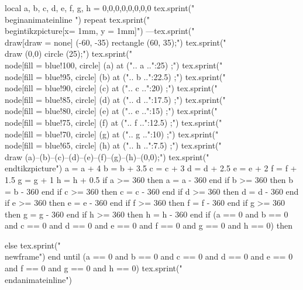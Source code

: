 
\usepackage{animate}
\usetikzlibrary{external}
\tikzexternalize[mode = list and make]

\begin{luacode}
local a, b, c, d, e, f, g, h = 0,0,0,0,0,0,0,0
tex.sprint("\\begin{animateinline}{24}")
repeat
	tex.sprint("\\begin{tikzpicture}[x= 1mm, y = 1mm]")
	---tex.sprint("\\draw[draw = none] (-60, -35) rectangle (60, 35);")
	tex.sprint("\\draw (0,0) circle (25);")
    tex.sprint("\\node[fill = blue!100, circle] (a) at (".. a ..":25) { };")
    tex.sprint("\\node[fill = blue!95, circle] (b) at (".. b ..":22.5) { };")
    tex.sprint("\\node[fill = blue!90, circle] (c) at (".. c ..":20) { };")
    tex.sprint("\\node[fill = blue!85, circle] (d) at (".. d ..":17.5) { };")
    tex.sprint("\\node[fill = blue!80, circle] (e) at (".. e ..":15) { };")
    tex.sprint("\\node[fill = blue!75, circle] (f) at (".. f ..":12.5) { };")
    tex.sprint("\\node[fill = blue!70, circle] (g) at (".. g ..":10) { };")
    tex.sprint("\\node[fill = blue!65, circle] (h) at (".. h ..":7.5) { };")
    tex.sprint("\\draw (a)--(b)--(c)--(d)--(e)--(f)--(g)--(h)--(0,0);")
    tex.sprint("\\end{tikzpicture}")
    a = a + 4
    b = b + 3.5
    c = c + 3
    d = d + 2.5
    e = e + 2
    f = f + 1.5
    g = g + 1
    h = h + 0.5
    if a >= 360 then
        a = a - 360
    end
    if b >= 360 then
        b = b - 360
    end
    if c >= 360 then
        c = c - 360
    end
    if d >= 360 then
        d = d - 360
    end
    if e >= 360 then
        e = e - 360
    end
    if f >= 360 then
        f = f - 360
    end
    if g >= 360 then
        g = g - 360
    end
    if h >= 360 then
        h = h - 360
    end
    if (a == 0 and b == 0 and c == 0 and d == 0 and e == 0 and f == 0 and g == 0 and h == 0) then
    	
    else
    	tex.sprint("\\newframe")
    end
until (a == 0 and b == 0 and c == 0 and d == 0 and e == 0 and f == 0 and g == 0 and h == 0)
tex.sprint("\\end{animateinline}")
\end{luacode}
